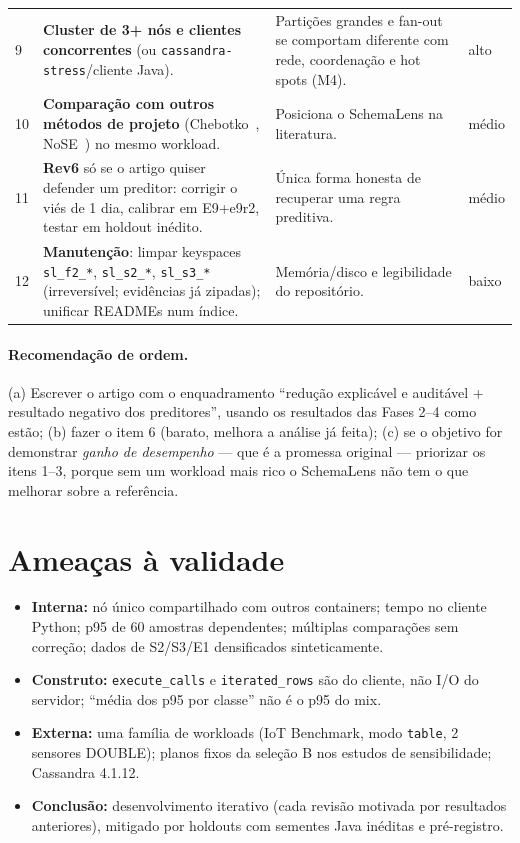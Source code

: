 \documentclass[11pt,a4paper]{article}
\begin{document}
\begin{longtable}{@{}p{0.4cm}p{5.2cm}p{6.3cm}p{1.8cm}@{}}
9 & \textbf{Cluster de 3+ nós e clientes concorrentes} (ou \texttt{cassandra-stress}/cliente Java). & Partições grandes e fan-out se comportam diferente com rede, coordenação e hot spots (M4). & alto\\
10 & \textbf{Comparação com outros métodos de projeto} (Chebotko~\cite{chebotko2015}, NoSE~\cite{nose}) no mesmo workload. & Posiciona o SchemaLens na literatura. & médio\\
11 & \textbf{Rev6} só se o artigo quiser defender um preditor: corrigir o viés de 1 dia, calibrar em E9+e9r2, testar em holdout inédito. & Única forma honesta de recuperar uma regra preditiva. & médio\\
12 & \textbf{Manutenção}: limpar keyspaces \texttt{sl\_f2\_*}, \texttt{sl\_s2\_*}, \texttt{sl\_s3\_*} (irreversível; evidências já zipadas); unificar READMEs num índice. & Memória/disco e legibilidade do repositório. & baixo\\
\bottomrule
\end{longtable}

\paragraph{Recomendação de ordem.} (a) Escrever o artigo com o enquadramento ``redução explicável e auditável + resultado negativo dos preditores'', usando os resultados das Fases 2--4 como estão; (b) fazer o item 6 (barato, melhora a análise já feita); (c) se o objetivo for demonstrar \emph{ganho de desempenho} --- que é a promessa original --- priorizar os itens 1--3, porque sem um workload mais rico o SchemaLens não tem o que melhorar sobre a referência.

\section{Ameaças à validade}
\begin{itemize}
\item \textbf{Interna:} nó único compartilhado com outros containers; tempo no cliente Python; p95 de 60 amostras dependentes; múltiplas comparações sem correção; dados de S2/S3/E1 densificados sinteticamente.
\item \textbf{Construto:} \texttt{execute\_calls} e \texttt{iterated\_rows} são do cliente, não I/O do servidor; ``média dos p95 por classe'' não é o p95 do mix.
\item \textbf{Externa:} uma família de workloads (IoT Benchmark, modo \texttt{table}, 2 sensores DOUBLE); planos fixos da seleção B nos estudos de sensibilidade; Cassandra 4.1.12.
\item \textbf{Conclusão:} desenvolvimento iterativo (cada revisão motivada por resultados anteriores), mitigado por holdouts com sementes Java inéditas e pré-registro.
\end{itemize}
\end{document}
